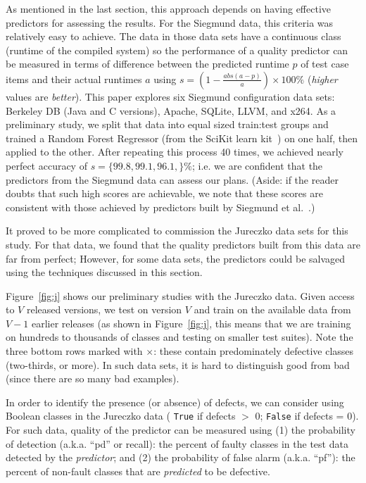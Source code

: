 \documentclass{sig-alternate}
\newcommand{\fig}[1]{Figure~\ref{fig:#1}}
\begin{document}
  As mentioned in the last section,  this approach depends on having effective predictors for assessing the results.
  For the Siegmund data, this criteria was   relatively easy to achieve.
  The data in those data sets have a continuous class (runtime of the compiled system)
  so the performance of a quality predictor can  be measured in terms of  difference between the predicted runtime $p$ of test case items and their actual runtimes $a$ using  $s= (1 - \frac{abs(a - p)}{a})\times100\%$ ({\em higher} values are {\em better}).
This paper  explores six Siegmund configuration data sets:  Berkeley DB (Java and C versions), Apache, SQLite, LLVM, and
  x264. 
  As a preliminary study, we split that data into equal sized train:test groups
  and trained a Random Forest
  Regressor (from the SciKit learn kit~\cite{Pedregosa2012})   on one half, then applied to the other. After repeating this process 40 times, we achieved nearly perfect accuracy of $s=\{99.8, 99.1, 96.1, \}\%$;
  i.e.  we are confident that the predictors from the Siegmund data can assess
our plans. (Aside: if the reader doubts that such high scores are achievable, we note that these scores are consistent with those achieved by predictors built by Siegmund et al.~\cite{sven12}.)



 It proved to be  more complicated to commission the Jureczko data sets for this study.
 For that data, we found that the
 quality predictors built from this data are far from perfect;
However, for some data sets, the  predictors could
be salvaged using the techniques discussed in this section.

 \fig{j} shows our preliminary studies with the Jureczko   data.
Given access to $V$ released
versions, we test on version $V$ and train on the available data from $V-1$ earlier releases (as
shown in \fig{j}, this means that we are training on hundreds to thousands
of classes and testing on smaller test suites).
Note the   \colorbox{lavenderpink}{three bottom} \colorbox{lavenderpink}{rows}   marked with $\times$: these contain predominately defective classes (two-thirds, or more).  In such data sets, it is hard to distinguish good from bad (since there are so many bad examples). 


In order to identify the presence (or absence) of defects, we can consider using Boolean classes in the  Jureczko data ( \texttt{True} if defects $\gt$ 0; \texttt{False} if defects = 0).
For such data, quality of the predictor can be measured using
(1) the  probability of detection (a.k.a. ``pd'' or recall):  the percent of faulty classes in
the test data detected
by the {\em predictor}; and (2) the 
probability of false alarm (a.k.a. ``pf''): the percent of non-fault
classes that are {\em predicted} to be defective.
\end{document}
